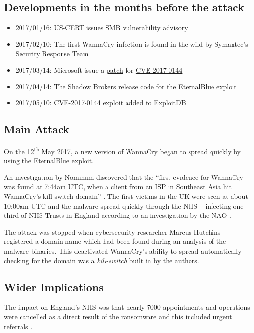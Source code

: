 \documentclass[12pt]{article}
\begin{document}
\subsection{Developments in the months before the attack}
\begin{itemize}
  \item 2017/01/16: US-CERT issues \href{https://www.us-cert.gov/ncas/current-activity/2017/01/16/SMB-Security-Best-Practices}{SMB vulnerability advisory}
  \item 2017/02/10: The first WannaCry infection is found in the wild by Symantec's Security Response Team \citep{blog:symantec:wannacry-lazarus:20170622}
  \item 2017/03/14: Microsoft issue a \href{https://technet.microsoft.com/en-us/library/security/ms17-010.aspx}{patch} for \href{https://www.cve.mitre.org/cgi-bin/cvename.cgi?name=CVE-2017-0144}{CVE-2017-0144}
  \item 2017/04/14: The Shadow Brokers release code for the EternalBlue exploit
  \item 2017/05/10: CVE-2017-0144 exploit added to ExploitDB
\end{itemize}
\subsection{Main Attack}
On the 12\textsuperscript{th} May 2017, a new version of WannaCry began to spread quickly by using the EternalBlue exploit.

An investigation by Nominum discovered that the ``first evidence for WannaCry was found at 7:44am UTC, when a client from an ISP in Southeast Asia hit WannaCry’s kill-switch domain'' \citep{blog:nominum:wannacry-dns:20170615}. The first victims in the UK were seen at about 10:00am UTC and the malware spread quickly through the NHS -- infecting one third of NHS Trusts in England according to an investigation by the NAO \citep{site:nao:wannacry-nhs:20171027}.

The attack was stopped when cybersecurity researcher Marcus Hutchins registered a domain name which had been found during an analysis of the malware binaries. This deactivated WannaCry's ability to spread automatically -- checking for the domain was a \textit{kill-switch} built in by the authors.

\subsection{Wider Implications}
The impact on England's NHS was that nearly 7000 appointments and operations were cancelled as a direct result of the ransomware and this included urgent referrals \citep{site:nao:wannacry-nhs:20171027}.
\end{document}
